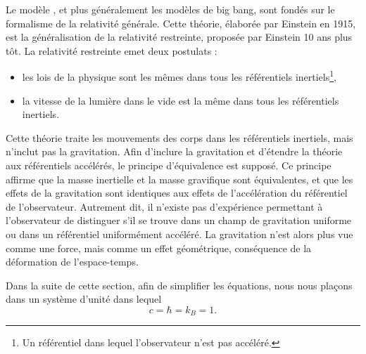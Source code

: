 \documentclass[11pt, twoside, a4paper, openright]{report}
\begin{document}
Le modèle \lcdm{}, et plus généralement les modèles de big bang, sont fondés sur le formalisme de la relativité générale.
Cette théorie, élaborée par Einstein en 1915, est la généralisation de la relativité restreinte, proposée par Einstein 10 ans plus tôt. La relativité restreinte emet deux postulats :
  \begin{itemize}[label=$\bullet$]
  \item les lois de la physique sont les mêmes dans tous les référentiels inertiels\footnote{Un référentiel dans lequel l'observateur n'est pas accéléré.},
  \item la vitesse de la lumière dans le vide est la même dans tous les référentiels inertiels.
  \end{itemize}
Cette théorie traite les mouvements des corps dans les référentiels inertiels, mais n'inclut pas la gravitation. Afin d'inclure la gravitation et d'étendre la théorie aux référentiels accélérés, le principe d'équivalence est supposé.
Ce principe affirme que la masse inertielle et la masse gravifique sont équivalentes, et que les effets de la gravitation sont identiques aux effets de l'accélération du référentiel de l'observateur. Autrement dit, il n'existe pas d'expérience permettant à l'observateur de distinguer s'il se trouve dans un champ de gravitation uniforme ou dans un référentiel uniformément accéléré. La gravitation n'est alors plus vue comme une force, mais comme un effet géométrique, conséquence de la déformation de l'espace-temps.

Dans la suite de cette section, afin de simplifier les équations, nous nous plaçons dans un système d'unité dans lequel
  \begin{equation}
    c = \hbar = k_{B} = 1 .
  \end{equation}
\end{document}

